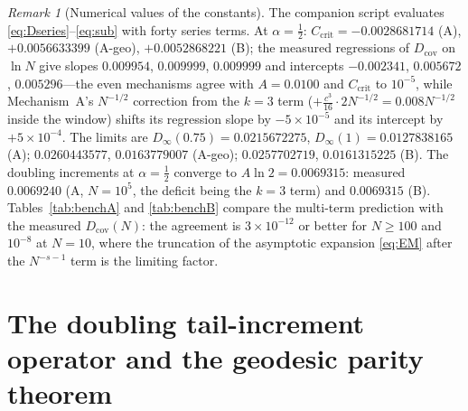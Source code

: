\documentclass[11pt,reqno]{amsart}
\theoremstyle{plain}
\theoremstyle{definition}
\theoremstyle{remark}
\newtheorem{remark}[theorem]{Remark}
\numberwithin{equation}{section}
\newcommand{\Dcov}{D_{\mathrm{cov}}}
\begin{document}
\begin{remark}[Numerical values of the constants]\label{rem:constants}
The companion script evaluates \eqref{eq:Dseries}--\eqref{eq:sub} with forty series terms. At $\alpha=\tfrac12$: $C_{\mathrm{crit}}=-0.0028681714$ (A), $+0.0056633399$ (A-geo), $+0.0052868221$ (B); the measured regressions of $\Dcov$ on $\ln N$ give slopes $0.009954$, $0.009999$, $0.009999$ and intercepts $-0.002341$, $0.005672$, $0.005296$---the even mechanisms agree with $A=0.0100$ and $C_{\mathrm{crit}}$ to $10^{-5}$, while Mechanism~A's $N^{-1/2}$ correction from the $k=3$ term ($+\frac{c^3}{16}\cdot2N^{-1/2}=0.008N^{-1/2}$ inside the window) shifts its regression slope by $-5\times10^{-5}$ and its intercept by $+5\times10^{-4}$. The limits are $D_\infty(0.75)=0.0215672275$, $D_\infty(1)=0.0127838165$ (A); $0.0260443577$, $0.0163779007$ (A-geo); $0.0257702719$, $0.0161315225$ (B). The doubling increments at $\alpha=\tfrac12$ converge to $A\ln2=0.0069315$: measured $0.0069240$ (A, $N=10^5$, the deficit being the $k=3$ term) and $0.0069315$ (B). Tables~\ref{tab:benchA} and \ref{tab:benchB} compare the multi-term prediction with the measured $\Dcov(N)$: the agreement is $3\times10^{-12}$ or better for $N\ge100$ and $10^{-8}$ at $N=10$, where the truncation of the asymptotic expansion \eqref{eq:EM} after the $N^{-s-1}$ term is the limiting factor.
\end{remark}

\section{The doubling tail-increment operator and the geodesic parity theorem}
\label{sec:tail}
\end{document}
